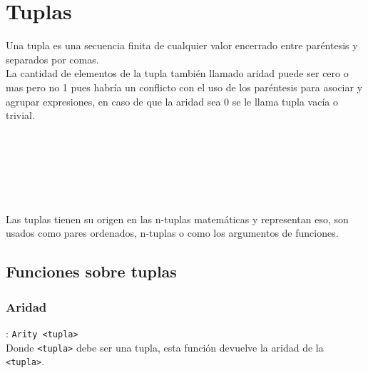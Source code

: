
\titlespacing{\subsection}{0pt}{10pt}{0pt}

\chapter{Tuplas}
   Una tupla es una secuencia finita de cualquier valor encerrado entre paréntesis y separados por comas.
   \\
   
   La cantidad de elementos de la tupla también llamado aridad puede ser cero o mas pero no 1 pues habría un conflicto con el uso de los paréntesis para asociar y agrupar expresiones, en caso de que la aridad sea 0 se le llama tupla vacía o trivial.
   
   \begin{fxcode}
      \\
      \\
      \arrowcode{()}\\
      \outcode{()}\\
      \\
   \end{fxcode}
   
   Las tuplas tienen su origen en las n-tuplas matemáticas y representan eso, son usados como pares ordenados, n-tuplas o como los argumentos de funciones.
   
   \section{Funciones sobre tuplas}
      \subsection*{Aridad}: \texttt{Arity <tupla>}\\
      Donde \texttt{<tupla>} debe ser una tupla, esta función devuelve la aridad de la \texttt{<tupla>}.
         
